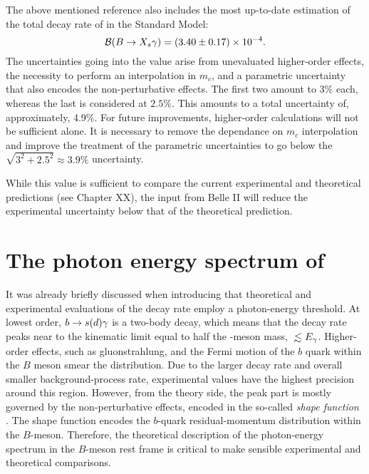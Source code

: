 The above mentioned reference also includes the most up-to-date estimation of the total decay rate of \BtoXsgamma in the Standard Model:
\begin{equation}
    \mathcal{B}({B\rightarrow X_{s} \gamma}) = (3.40\pm 0.17) \times 10^{-4}.
\end{equation}
The uncertainties going into the value arise from unevaluated higher-order effects, the necessity to perform an interpolation in $m_c$, and a parametric uncertainty that also encodes the non-perturbative effects.
The first two amount to $3\%$ each, whereas the last is considered at $2.5\%$. 
This amounts to a total uncertainty of, approximately, 4.9\%.
For future improvements, higher-order calculations will not be sufficient alone.
It is necessary to remove the dependance on $m_c$ interpolation and improve the treatment of the parametric uncertainties to go below the $\sqrt{3^2+2.5^2}\approx3.9\%$ uncertainty.

While this value is sufficient to compare the current experimental and theoretical predictions (see Chapter XX), the input from Belle II will reduce the experimental uncertainty below that of the theoretical prediction.


\section{The photon energy spectrum of \texorpdfstring{\BtoXsdgamma}{B->Xsg}}\label{eq:btosgamma_spectrum_theory}

It was already briefly discussed when introducing  that theoretical and experimental evaluations of the \BtoXsgamma decay rate employ a photon-energy threshold.
At lowest order, $b\rightarrow s(d) \gamma$ is a two-body decay, which means that the decay rate peaks near to the kinematic limit equal to half the \B-meson mass, $\lsim E_{\g}$.
Higher-order effects, such as gluonstrahlung, and the Fermi motion of the $b$ quark within the $B$ meson smear the distribution.
Due to the larger \BtoXsgamma decay rate and overall smaller background-process rate, experimental values have the highest precision around this region.
However, from the theory side, the peak part is mostly governed by the non-perturbative effects, encoded in the so-called \textit{shape function} \cite{Ligeti:2008ac}.
The shape function encodes the $b$-quark residual-momentum distribution within the $B$-meson. 
Therefore, the theoretical description of the photon-energy spectrum in the $B$-meson rest frame is critical to make sensible experimental and theoretical comparisons.


